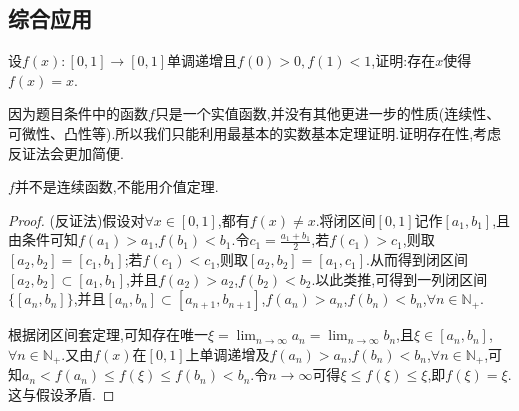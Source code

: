 \documentclass[lang=cn,newtx,10pt,scheme=chinese]{elegantbook}
\begin{document}
\subsection{综合应用}

\begin{example}
   设\(f(x):[0,1]\to[0,1]\)单调递增且\(f(0)>0,f(1)<1\),证明:存在\(x\)使得\(f(x)=x\).
\end{example}
\begin{note}
因为题目条件中的函数$f$只是一个实值函数,并没有其他更进一步的性质(连续性、可微性、凸性等).所以我们只能利用最基本的实数基本定理证明.证明存在性,考虑反证法会更加简便.
\end{note}
\begin{remark}
   $f$并不是连续函数,不能用介值定理.
\end{remark}
\begin{proof}
   (反证法)假设对$\forall x\in[0,1]$,都有$f(x)\ne x$.将闭区间\([0,1]\)记作\([a_1,b_1]\),且由条件可知\(f(a_1)>a_1\),\(f(b_1)<b_1\).令\(c_1=\frac{a_1 + b_1}{2}\),若\(f(c_1)>c_1\),则取\([a_2,b_2]=[c_1,b_1]\);若\(f(c_1)<c_1\),则取\([a_2,b_2]=[a_1,c_1]\).从而得到闭区间\([a_2,b_2]\subset [a_1,b_1]\),并且\(f(a_2)>a_2\),\(f(b_2)<b_2\).以此类推,可得到一列闭区间\(\{[a_n,b_n]\}\),并且\([a_n,b_n]\subset [a_{n + 1},b_{n + 1}]\),\(f(a_n)>a_n\),\(f(b_n)<b_n\),\(\forall n\in\mathbb{N}_+\).

   根据闭区间套定理,可知存在唯一\(\xi=\lim_{n\rightarrow\infty}a_n=\lim_{n\rightarrow\infty}b_n\),且\(\xi\in [a_n,b_n]\),\(\forall n\in\mathbb{N}_+\).又由\(f(x)\)在\([0,1]\)上单调递增及\(f(a_n)>a_n\),\(f(b_n)<b_n\),\(\forall n\in\mathbb{N}_+\),可知\(a_n<f(a_n)\leqslant f(\xi)\leqslant f(b_n)<b_n\).令\(n\rightarrow\infty\)可得\(\xi\leqslant f(\xi)\leqslant\xi\),即\(f(\xi)=\xi\).这与假设矛盾.
\end{proof}
\end{document}
